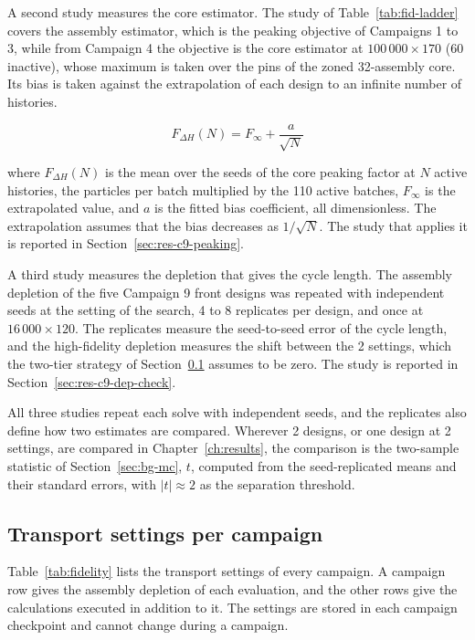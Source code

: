 A second study measures the core estimator. The study of
Table~\ref{tab:fid-ladder} covers the assembly estimator, which is the
peaking objective of Campaigns 1 to 3, while from Campaign 4 the
objective is the core estimator at $100\,000\times170$ (60 inactive),
whose maximum is taken over the pins of the zoned 32-assembly core. Its
bias is taken against the extrapolation of each design to an infinite
number of histories.

\begin{equation}
F_{\Delta H}(N) = F_\infty + \frac{a}{\sqrt{N}}
\label{eq:fdh-extrap}
\end{equation}

\noindent where $F_{\Delta H}(N)$ is the mean over the seeds of the core
peaking factor at $N$ active histories, the particles per batch
multiplied by the 110 active batches, $F_\infty$ is the extrapolated
value, and $a$ is the fitted bias coefficient, all dimensionless. The
extrapolation assumes that the bias decreases as $1/\sqrt{N}$. The study
that applies it is reported in Section~\ref{sec:res-c9-peaking}.

A third study measures the depletion that gives the cycle length. The
assembly depletion of the five Campaign 9 front designs was repeated
with independent seeds at the setting of the search, 4 to 8
replicates per design, and once at $16\,000\times120$. The replicates
measure the seed-to-seed error of the cycle length, and the
high-fidelity depletion measures the shift between the 2 settings, which
the two-tier strategy of Section~\ref{sec:meth-fid-settings} assumes to
be zero. The study is reported in Section~\ref{sec:res-c9-dep-check}.

All three studies repeat each solve with independent seeds, and the
replicates also define how two estimates are compared. Wherever 2 designs, or one design at 2
settings, are compared in Chapter~\ref{ch:results}, the comparison is
the two-sample statistic of Section~\ref{sec:bg-mc}, $t$, computed from
the seed-replicated means and their standard errors, with
$|t| \approx 2$ as the separation threshold.

\subsection{Transport settings per campaign}
\label{sec:meth-fid-settings}

Table~\ref{tab:fidelity} lists the transport settings of every campaign.
A campaign row gives the assembly depletion of each evaluation, and the
other rows give the calculations executed in addition to it. The settings
are stored in each campaign checkpoint and cannot change during a
campaign.

